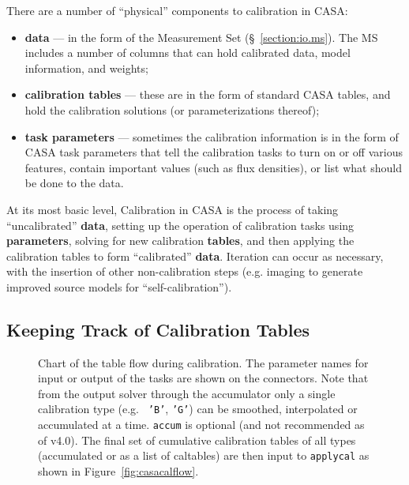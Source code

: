 There are a number of ``physical'' components to calibration in CASA:
\begin{itemize}
   \item {\bf data} --- in the form of the Measurement Set
      (\S~\ref{section:io.ms}).  The MS includes a number of
      columns that can hold calibrated data, model information,
      and weights;
   \item {\bf calibration tables} --- these are in the form of
      standard CASA tables, and hold the calibration solutions
      (or parameterizations thereof);
   \item {\bf task parameters} --- sometimes the calibration
      information is in the form of CASA task parameters that
      tell the calibration tasks to turn on or off various
      features, contain important values (such as flux densities),
      or list what should be done to the data.
\end{itemize}

At its most basic level, Calibration in CASA is the process of taking
``uncalibrated'' {\bf data}, setting up the operation of calibration
tasks using {\bf parameters}, solving for new calibration {\bf
tables}, and then applying the calibration tables to form 
``calibrated'' {\bf data}.  Iteration can occur as necessary, with
the insertion of other non-calibration steps
(e.g. imaging to generate improved source models for
``self-calibration'').

\subsection{Keeping Track of Calibration Tables}
\label{section:cal.flow.tables}

\begin{figure}[h!]
\begin{center}
\caption{\label{fig:casacaltables} Chart of the table flow during
  calibration. The parameter names for input or output of the tasks
  are shown on the connectors.  Note that from the output solver
  through the accumulator only a single calibration type (e.g. {\tt
    'B'}, {\tt 'G'}) can be smoothed, interpolated or accumulated at a
  time.  {\tt accum} is optional (and not recommended as of v4.0). The final
  set of cumulative calibration tables of all types (accumulated or
  as a list of caltables) are then input to {\tt applycal} as shown in
  Figure~\ref{fig:casacalflow}. }
\hrulefill
\end{center}
\end{figure}

